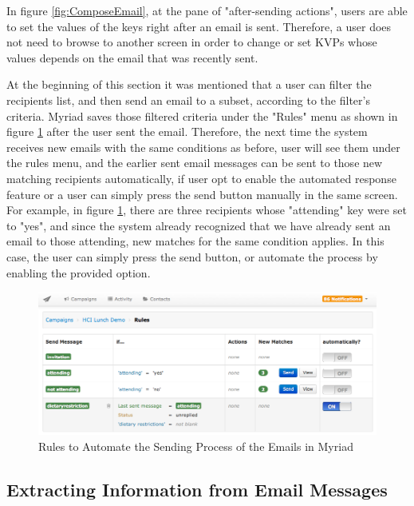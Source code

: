In figure \ref{fig:ComposeEmail}, at the pane of "after-sending actions", users are able to set the values of the keys right after an email is sent. Therefore, a user does not need to browse to another screen in order to change or set \ac{KVP}s whose values depends on the email that was recently sent.
\vspace{1cm}

At the beginning of this section it was mentioned that a user can filter the recipients list, and then send an email to a subset, according to the filter's criteria. Myriad saves those filtered criteria under the "Rules" menu as shown in figure \ref{fig:AutomatedRules} after the user sent the email. Therefore, the next time the system receives new emails with the same conditions as before, user will see them under the rules menu, and the earlier sent email messages can be sent to those new matching recipients automatically, if user opt to enable the automated response feature or a user can simply press the send button manually in the same screen. For example, in figure \ref{fig:AutomatedRules}, there are three recipients whose "attending" key were set to "yes", and since the system already recognized that we have already sent an email to those attending, new matches for the same condition applies. In this case, the user can simply press the send button, or automate the process by enabling the provided option.

\clearpage

\begin{figure}[htbp]
	\centering
	\includegraphics[width=1.00\textwidth]{imgs/AutomatedRules.png}
	\caption[Rules to Automate the Sending Process of the Emails in Myriad]{Rules to Automate the Sending Process of the Emails in Myriad}
	\label{fig:AutomatedRules}
\end{figure}

\subsection{Extracting Information from Email Messages}
\label{subsec:5.2.5:ExtrInfoEmaiMess}


